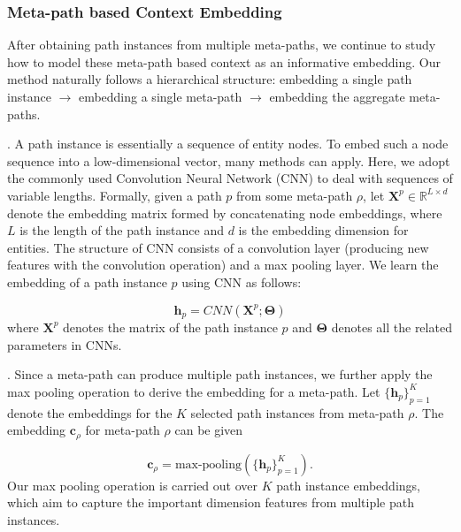 \subsubsection{Meta-path based Context Embedding} After obtaining path instances from multiple meta-paths, we continue to study how to model these
meta-path based context as an informative embedding. Our method naturally follows a hierarchical structure: embedding a single path instance $\rightarrow$  embedding a single meta-path $\rightarrow$  embedding the aggregate meta-paths.

.  A path instance is essentially a sequence of entity nodes.
To embed such a node sequence into a low-dimensional vector, many methods can apply. Here, we adopt the commonly used Convolution Neural Network (CNN) to deal with sequences of variable lengths. Formally, given a path $p$ from some meta-path $\rho$, let $\mathbf{X}^{p} \in \mathbb{R}^{L \times d}$ denote the embedding matrix formed by concatenating node embeddings, where  $L$ is the length of the path instance and $d$ is the embedding dimension for entities. The structure of CNN consists of a convolution layer (producing new features with the convolution operation) and a max pooling layer. We learn the embedding of a path instance $p$ using CNN as follows:

\begin{equation} \label{equ-pathembedding}
\mathbf{h}_p = CNN(\mathbf{X}^{p}; \mathbf{\Theta})
\end{equation}
where $\mathbf{X}^{p}$ denotes the matrix of the path instance $p$ and $\mathbf{\Theta}$ denotes all the related parameters in CNNs.

. Since a meta-path can produce multiple path instances,  we further apply the max pooling operation to derive the embedding for a meta-path. Let $\{\mathbf{h}_p\}_{p = 1}^{K}$ denote the embeddings for the $K$ selected path instances from meta-path $\rho$.
The embedding $\mathbf{c}_\rho$ for meta-path $\rho$ can be given

\begin{equation} \label{equ-pooling}
\mathbf{c}_\rho = \text{max-pooling}(\{\mathbf{h}_p\}_{p = 1}^{K}).
\end{equation}
Our max pooling operation is carried out over $K$ path instance embeddings, which aim to capture the important dimension features from multiple path instances.

